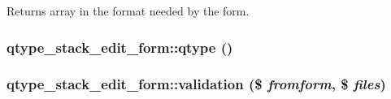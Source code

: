 \begin{DoxyReturn}{Returns}
array in the format needed by the form. 
\end{DoxyReturn}
\hypertarget{classqtype__stack__edit__form_a1c7f53813d4245cc61b5d41a526dd2ba}{
\subsubsection[{qtype}]{\setlength{\rightskip}{0pt plus 5cm}qtype\_\-stack\_\-edit\_\-form::qtype ()}}
\label{classqtype__stack__edit__form_a1c7f53813d4245cc61b5d41a526dd2ba}
\hypertarget{classqtype__stack__edit__form_aefcc5794da54566c77717d20fd8f8dce}{
\subsubsection[{validation}]{\setlength{\rightskip}{0pt plus 5cm}qtype\_\-stack\_\-edit\_\-form::validation (\$ {\em fromform}, \/  \$ {\em files})}}
\label{classqtype__stack__edit__form_aefcc5794da54566c77717d20fd8f8dce}


